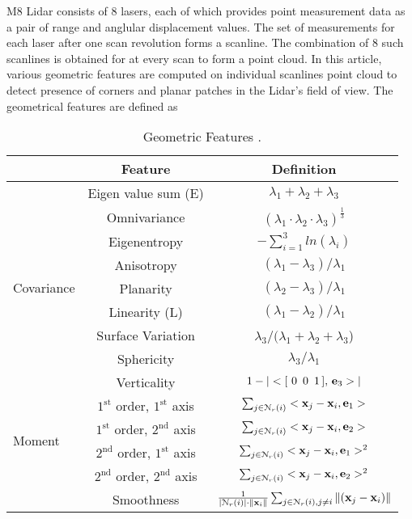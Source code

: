 
M8 Lidar consists of 8 lasers, each of which provides point measurement data as a pair of range and anglular displacement values.
The set of measurements for each laser after one scan revolution forms a scanline. The combination of 8 such scanlines is obtained for at every scan to form a point cloud.
In this article, various geometric features are computed on individual scanlines point cloud to detect presence of corners and planar patches in the Lidar's field of view. The geometrical features are defined as\begin{table}[h!]
	\centering
	\begin{tabular}[h]{|l|c|c|}
		\hline
		& Feature	& Definition \T \\ \hline
		\multirow{9}{*}{Covariance}	& Eigen value sum (E) &	$\lambda_1 + \lambda_2 + \lambda_3$ \T \\ 
		\multirow{9}{*}{}	& Omnivariance & $(\lambda_1 \cdot \lambda_2 \cdot \lambda_3)^{\frac{1}{3}}$	\T \\
		\multirow{9}{*}{}	& Eigenentropy &	$- \sum_{i=1}^{3} ln(\lambda_i)$ \T \\ 
		\multirow{9}{*}{}	& Anisotropy &	$(\lambda_1 - \lambda_3) / \lambda_1$ \T \\ 
		\multirow{9}{*}{}	& Planarity &	$(\lambda_2 - \lambda_3) / \lambda_1$ \T \\ 
		\multirow{9}{*}{}	& Linearity (L) &	$(\lambda_1 - \lambda_2) / \lambda_1$ \T \\ 
		\multirow{9}{*}{}	& Surface Variation &	$\lambda_3 / (\lambda_1 + \lambda_2 + \lambda_3$) \T \\ 
		\multirow{9}{*}{}	& Sphericity &	$\lambda_3 / \lambda_1$ \T \\ 
		\multirow{9}{*}{}	& Verticality &	$1 - |<[\,\, 0 \,\,\, 0 \,\,\, 1\,], \, \mathbf{e}_3 >|$ \T \\ 
		\hline		
		\multirow{4}{*}{Moment}	& $1^\text{st}$ order, $1^\text{st}$ axis &	$\sum_{j \in \EuScript{N}_{r}(i)}^{} <\mathbf{x}_j - \mathbf{x}_i, \mathbf{e}_1>$	\T \\ 
		\multirow{4}{*}{}	& $1^\text{st}$ order, $2^\text{nd}$ axis & $\sum_{j \in \EuScript{N}_{r}(i)}^{} <\mathbf{x}_j - \mathbf{x}_i, \mathbf{e}_2>$	\T \\ 
		\multirow{4}{*}{}	& $2^\text{nd}$ order, $1^\text{st}$ axis & $\sum_{j \in \EuScript{N}_{r}(i)}^{} <\mathbf{x}_j - \mathbf{x}_i, \mathbf{e}_1>^2$	\T \\ 
		\multirow{4}{*}{}	& $2^\text{nd}$ order, $2^\text{nd}$ axis & $\sum_{j \in \EuScript{N}_{r}(i)}^{} <\mathbf{x}_j - \mathbf{x}_i, \mathbf{e}_2>^2$	\T \\ 
		\hline
		& Smoothness & $ \frac{1}{|\EuScript{N}_{r}(i)| \cdot \| \mathbf{x}_i\|} \sum_{j \in \EuScript{N}_{r}(i), j \neq i}^{} \|(\mathbf{x}_j - \mathbf{x}_i) \|$	\T \\
		\hline			
		
	\end{tabular}
	\caption{Geometric Features \cite{hackel2016fast}.}
	\label{table:geometric_features}
\end{table}